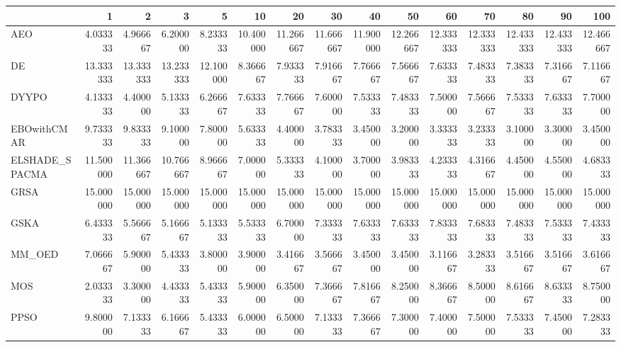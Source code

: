 \begin{tabular}{lrrrrrrrrrrrrrr}
\toprule
{} &        1   &        2   &        3   &        5   &        10  &        20  &        30  &        40  &        50  &        60  &        70  &        80  &        90  &        100 \\
\midrule
AEO            &   4.033333 &   4.966667 &   6.200000 &   8.233333 &  10.400000 &  11.266667 &  11.666667 &  11.900000 &  12.266667 &  12.333333 &  12.333333 &  12.433333 &  12.433333 &  12.466667 \\
DE             &  13.333333 &  13.333333 &  13.233333 &  12.100000 &   8.366667 &   7.933333 &   7.916667 &   7.766667 &   7.566667 &   7.633333 &   7.483333 &   7.383333 &   7.316667 &   7.116667 \\
DYYPO          &   4.133333 &   4.400000 &   5.133333 &   6.266667 &   7.633333 &   7.766667 &   7.600000 &   7.533333 &   7.483333 &   7.500000 &   7.566667 &   7.533333 &   7.633333 &   7.700000 \\
EBOwithCMAR    &   9.733333 &   9.833333 &   9.100000 &   7.800000 &   5.633333 &   4.400000 &   3.783333 &   3.450000 &   3.200000 &   3.333333 &   3.233333 &   3.100000 &   3.300000 &   3.450000 \\
ELSHADE\_SPACMA &  11.500000 &  11.366667 &  10.766667 &   8.966667 &   7.000000 &   5.333333 &   4.100000 &   3.700000 &   3.983333 &   4.233333 &   4.316667 &   4.450000 &   4.550000 &   4.683333 \\
GRSA           &  15.000000 &  15.000000 &  15.000000 &  15.000000 &  15.000000 &  15.000000 &  15.000000 &  15.000000 &  15.000000 &  15.000000 &  15.000000 &  15.000000 &  15.000000 &  15.000000 \\
GSKA           &   6.433333 &   5.566667 &   5.166667 &   5.133333 &   5.533333 &   6.700000 &   7.333333 &   7.633333 &   7.633333 &   7.833333 &   7.683333 &   7.483333 &   7.533333 &   7.433333 \\
MM\_OED         &   7.066667 &   5.900000 &   5.433333 &   3.800000 &   3.900000 &   3.416667 &   3.566667 &   3.450000 &   3.450000 &   3.116667 &   3.283333 &   3.516667 &   3.516667 &   3.616667 \\
MOS            &   2.033333 &   3.300000 &   4.433333 &   5.433333 &   5.900000 &   6.350000 &   7.366667 &   7.816667 &   8.250000 &   8.366667 &   8.500000 &   8.616667 &   8.633333 &   8.750000 \\
PPSO           &   9.800000 &   7.133333 &   6.166667 &   5.433333 &   6.000000 &   6.500000 &   7.133333 &   7.366667 &   7.300000 &   7.400000 &   7.500000 &   7.533333 &   7.450000 &   7.283333 \\

\end{tabular}
